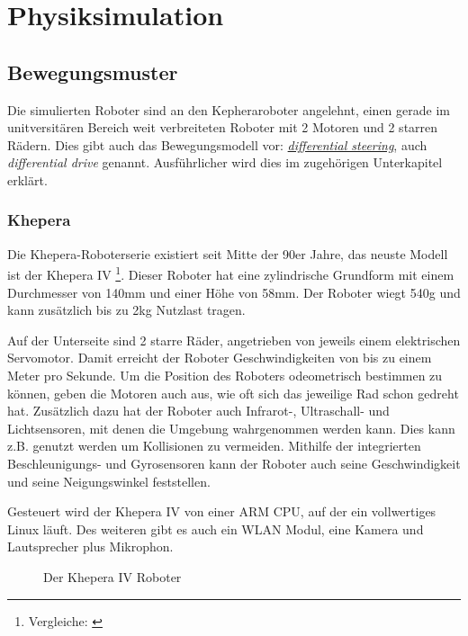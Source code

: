 \clearpage
\section{Physiksimulation}

\subsection{Bewegungsmuster}
Die simulierten Roboter sind an den Kepheraroboter angelehnt, einen gerade im unitversit{\"{a}}ren Bereich weit verbreiteten Roboter mit 2 Motoren und 2 starren R{\"{a}}dern.
Dies gibt auch das Bewegungsmodell vor: \hyperref[diffs]{\textit{differential steering}}, auch \textit{differential drive} genannt. Ausf{\"{u}}hrlicher wird dies im zugeh{\"{o}}rigen Unterkapitel erkl{\"{a}}rt.

\subsubsection{Khepera}\label{khepera}
Die Khepera-Roboterserie existiert seit Mitte der 90er Jahre, das neuste Modell ist der Khepera IV
\footnote{Vergleiche: \cite{Soares2016}}.
Dieser Roboter hat eine zylindrische Grundform mit einem Durchmesser von 140mm und einer
H{\"{o}}he von 58mm. Der Roboter wiegt 540g und kann zus{\"{a}}tzlich bis zu 2kg Nutzlast tragen.

Auf der Unterseite sind 2 starre R{\"{a}}der, angetrieben von jeweils einem elektrischen Servomotor.
Damit erreicht der Roboter Geschwindigkeiten von bis zu einem Meter pro Sekunde. Um die Position des
Roboters odeometrisch bestimmen zu k{\"{o}}nnen, geben die Motoren auch aus, wie oft sich das
jeweilige Rad schon gedreht hat. Zus{\"{a}}tzlich dazu hat der Roboter auch Infrarot-, Ultraschall-
und Lichtsensoren, mit denen die Umgebung wahrgenommen werden kann. Dies kann z.B. genutzt werden
um Kollisionen zu vermeiden. Mithilfe der integrierten Beschleunigungs- und Gyrosensoren kann
der Roboter auch seine Geschwindigkeit und seine Neigungswinkel feststellen.

Gesteuert wird der Khepera IV von einer ARM CPU, auf der ein vollwertiges Linux l{\"{a}}uft. Des weiteren gibt es auch ein WLAN Modul, eine Kamera und Lautsprecher plus Mikrophon.

\begin{figure}
	\centering
	\caption{Der Khepera IV Roboter}
	\label{fig:kheperaiv}
\end{figure}
\clearpage

